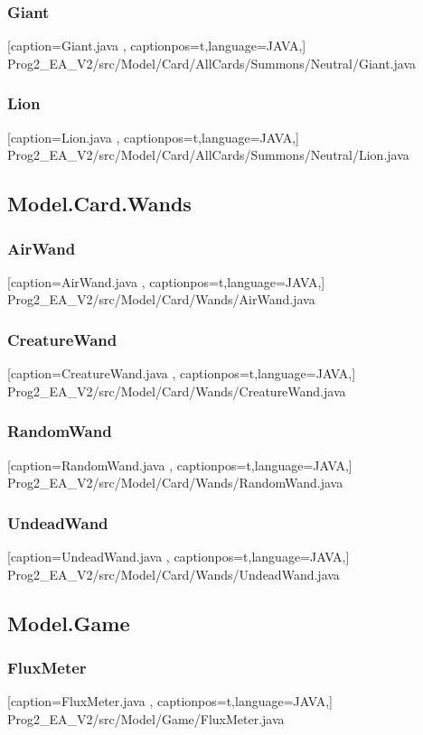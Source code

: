 \documentclass[a4paper,12pt]{scrartcl}
\begin{document}
	\subsubsection{Giant}
	
	[caption={Giant.java}
	\label{lst:javaclass},
	captionpos=t,language=JAVA,]
	{Prog2_EA_V2/src/Model/Card/AllCards/Summons/Neutral/Giant.java}
	\subsubsection{Lion}
	
	[caption={Lion.java}
	\label{lst:javaclass},
	captionpos=t,language=JAVA,]
	{Prog2_EA_V2/src/Model/Card/AllCards/Summons/Neutral/Lion.java}
	\subsection{Model.Card.Wands}
	\subsubsection{AirWand}
	
	[caption={AirWand.java}
	\label{lst:javaclass},
	captionpos=t,language=JAVA,]
	{Prog2_EA_V2/src/Model/Card/Wands/AirWand.java}
	\subsubsection{CreatureWand}
	
	[caption={CreatureWand.java}
	\label{lst:javaclass},
	captionpos=t,language=JAVA,]
	{Prog2_EA_V2/src/Model/Card/Wands/CreatureWand.java}
	\subsubsection{RandomWand}
	
	[caption={RandomWand.java}
	\label{lst:javaclass},
	captionpos=t,language=JAVA,]
	{Prog2_EA_V2/src/Model/Card/Wands/RandomWand.java}
	\subsubsection{UndeadWand}
	
	[caption={UndeadWand.java}
	\label{lst:javaclass},
	captionpos=t,language=JAVA,]
	{Prog2_EA_V2/src/Model/Card/Wands/UndeadWand.java}
	\subsection{Model.Game}
	\subsubsection{FluxMeter}
	
	[caption={FluxMeter.java}
	\label{lst:javaclass},
	captionpos=t,language=JAVA,]
	{Prog2_EA_V2/src/Model/Game/FluxMeter.java}
\end{document}
